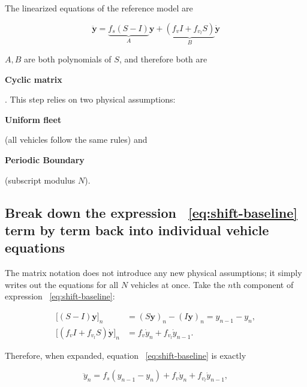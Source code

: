 \documentclass[11pt,a4paper,openany]{book}
\numberwithin{equation}{chapter}
\numberwithin{figure}{chapter}
\numberwithin{table}{chapter}
\begin{document}
The linearized equations of the reference model are

\begin{equation}
\ddot{\mathbf y} = \underbrace{f_s\left(S-I\right)}_{A}\mathbf y + \underbrace{\left(f_vI+f_{v_l}S\right)}_{B}\dot{\mathbf y}
\label{eq:shift-baseline}
\end{equation}

$A,B$ are both polynomials of $S$, and therefore both are




\textbf{Cyclic matrix}




. This step relies on two physical assumptions:




\textbf{Uniform fleet}




(all vehicles follow the same rules) and




\textbf{Periodic Boundary}




(subscript modulus $N$).










\subsection{Break down the expression ~\eqref{eq:shift-baseline} term by term back into individual vehicle equations}





The matrix notation does not introduce any new physical assumptions; it simply writes out the equations for all $N$ vehicles at once. Take the $n$th component of expression ~\eqref{eq:shift-baseline}:

\begin{align}
\bigl[(S-I)\mathbf y\bigr]_n
&=(S\mathbf y)_n-(I\mathbf y)_n=y_{n-1}-y_n,\\
\bigl[(f_vI+f_{v_l}S)\dot{\mathbf y}\bigr]_n
&=f_v\dot y_n+f_{v_l}\dot y_{n-1}.
\end{align}

Therefore, when expanded, equation ~\eqref{eq:shift-baseline} is exactly

\begin{equation}
\ddot y_n=f_s(y_{n-1}-y_n)+f_v\dot y_n+f_{v_l}\dot y_{n-1},
\end{equation}
\end{document}
